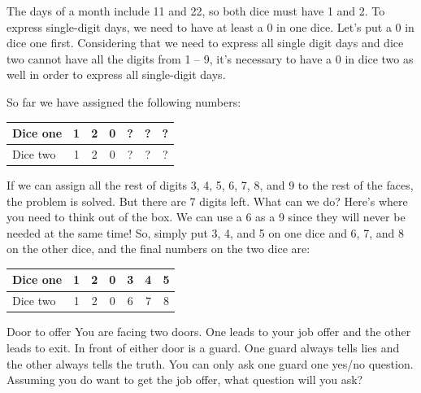\begin{solution}
The days of a month include 11 and 22, so both dice must have 1 and 2. To express single-digit
days, we need to have at least a 0 in one dice. Let's put a 0 in dice one first. Considering that
we need to express all single digit days and dice two cannot have all the digits from 1 -- 9, it's
necessary to have a 0 in dice two as well in order to express all single-digit days.

So far we have assigned the following numbers:

\begin{center}
{\renewcommand{\arraystretch}{1.15}%
\setlength{\tabcolsep}{5pt}%
\begin{tabular}{@{}lcccccc@{}}
\toprule
Dice one & 1 & 2 & 0 & ? & ? & ? \\
\midrule
Dice two & 1 & 2 & 0 & ? & ? & ? \\
\bottomrule
\end{tabular}}
\end{center}

If we can assign all the rest of digits 3, 4, 5, 6, 7, 8, and 9 to the rest of the faces, the
problem is solved. But there are 7 digits left. What can we do? Here's where you need to think
out of the box. We can use a 6 as a 9 since they will never be needed at the same time! So,
simply put 3, 4, and 5 on one dice and 6, 7, and 8 on the other dice, and the final numbers on
the two dice are:

\begin{center}
{\renewcommand{\arraystretch}{1.15}%
\setlength{\tabcolsep}{5pt}%
\begin{tabular}{@{}lcccccc@{}}
\toprule
Dice one & 1 & 2 & 0 & 3 & 4 & 5 \\
\midrule
Dice two & 1 & 2 & 0 & 6 & 7 & 8 \\
\bottomrule
\end{tabular}}
\end{center}
\end{solution}

\begin{problem}{Door to offer}
You are facing two doors. One leads to your job offer and the other leads to exit. In front of
either door is a guard. One guard always tells lies and the other always tells the truth. You can
only ask one guard one yes/no question. Assuming you do want to get the job offer, what question
will you ask?
\end{problem}

